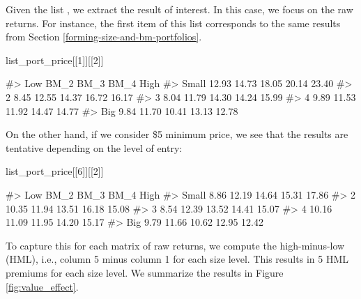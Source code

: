 Given the list , we extract the result of
interest. In this case, we focus on the raw returns. For instance, the
first item of this list corresponds to the same results from Section \ref{forming-size-and-bm-portfolios}.
\begin{Schunk}
\begin{Sinput}
list_port_price[[1]][[2]]
\end{Sinput}
\begin{Soutput}
#>         Low  BM_2  BM_3  BM_4  High
#> Small 12.93 14.73 18.05 20.14 23.40
#> 2      8.45 12.55 14.37 16.72 16.17
#> 3      8.04 11.79 14.30 14.24 15.99
#> 4      9.89 11.53 11.92 14.47 14.77
#> Big    9.84 11.70 10.41 13.13 12.78
\end{Soutput}
\end{Schunk}
On the other hand, if we consider \$5 minimum price, we see that the
results are tentative depending on the level of entry:
\begin{Schunk}
\begin{Sinput}
list_port_price[[6]][[2]]
\end{Sinput}
\begin{Soutput}
#>         Low  BM_2  BM_3  BM_4  High
#> Small  8.86 12.19 14.64 15.31 17.86
#> 2     10.35 11.94 13.51 16.18 15.08
#> 3      8.54 12.39 13.52 14.41 15.07
#> 4     10.16 11.09 11.95 14.20 15.17
#> Big    9.79 11.66 10.62 12.95 12.42
\end{Soutput}
\end{Schunk}

To capture this for each matrix of raw returns, we compute the
high-minus-low (HML), i.e., column 5 minus column 1 for each size
level. This results in 5 HML premiums for each size level. We summarize
the results in Figure \ref{fig:value_effect}.


